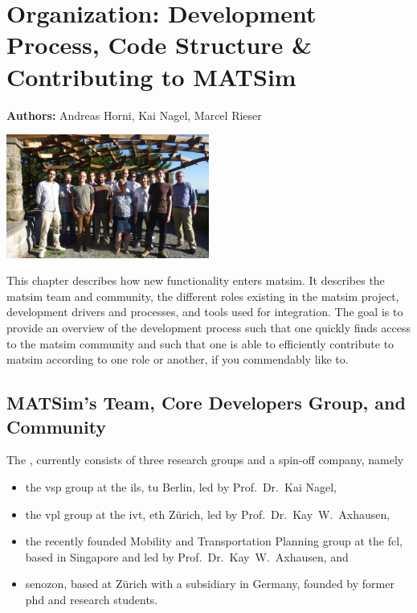 \chapter{Organization: Development Process, Code Structure \& Contributing to MATSim}
\label{ch:developmentprocess}

\hfill \textbf{Authors:} Andreas Horni, Kai Nagel, Marcel Rieser

\begin{center} \includegraphics[width=0.5\textwidth, angle=0]{extending/figures/ConceptualMeetingVillaHatt.png} \end{center}

This chapter describes how new functionality enters \gls{matsim}. It describes the \gls{matsim} team and community, the different roles existing in the \gls{matsim} project, development drivers and processes, and tools used for integration. The goal is to 
provide an overview of the development process such that 
one quickly finds access to the \gls{matsim} community and such that 
one is able to efficiently contribute to \gls{matsim} according to one role or another, if you commendably like to.

\section{MATSim's Team, Core Developers Group, and Community}
The , 
currently consists of three research groups and a spin-off company, namely 
\begin{itemize}\styleItemize
\item the \gls{vsp} group at the \gls{ils}, \gls{tu} Berlin, led by Prof.~Dr.~Kai Nagel,
\item the \gls{vpl} group at the \gls{ivt}, \gls{eth} Zürich, led by Prof.~Dr.~Kay~W.~Axhausen, 
\item the recently founded Mobility and Transportation Planning group at the \gls{fcl}, based in Singapore and led by Prof.~Dr.~Kay~W.~Axhausen, and 
\item \gls{senozon}, based at Zürich with a subsidiary in Germany, founded by former \acrshort{phd} and research students. 
\end{itemize}

